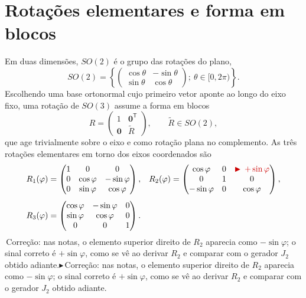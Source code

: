 \documentclass[12pt,a4paper]{article}   %
\newcommand{\nota}[1]{{\color{vermelho}%
  \ifmmode\blacktriangleright\,#1\else$\blacktriangleright$\,#1\fi}}
\begin{document}
\section{Rota\c{c}\~oes elementares e forma em blocos}

Em duas dimens\~oes, $SO(2)$ \'e o grupo das rota\c{c}\~oes do plano,
\begin{equation}
SO(2)=\left\{
\begin{pmatrix} \cos\theta & -\sin\theta \\ \sin\theta & \cos\theta
\end{pmatrix};\ \theta\in[0,2\pi)\right\}.
\end{equation}
Escolhendo uma base ortonormal cujo primeiro vetor aponte ao longo do
eixo fixo, uma rota\c{c}\~ao de $SO(3)$ assume a forma em blocos
\begin{equation}
R=\begin{pmatrix} 1 & \bm{0}^{\mathsf T}\\[2pt] \bm{0} & \tilde R
\end{pmatrix},\qquad \tilde R\in SO(2),
\end{equation}
que age trivialmente sobre o eixo e como rota\c{c}\~ao plana no
complemento. As tr\^es rota\c{c}\~oes elementares em torno dos eixos
coordenados s\~ao
\begin{align}
R_1(\varphi)&=\begin{pmatrix}
1 & 0 & 0\\ 0 & \cos\varphi & -\sin\varphi\\ 0 & \sin\varphi & \cos\varphi
\end{pmatrix},
&
R_2(\varphi)&=\begin{pmatrix}
\cos\varphi & 0 & \nota{+\sin\varphi}\\ 0 & 1 & 0\\ -\sin\varphi & 0 & \cos\varphi
\end{pmatrix},
\\[4pt]
R_3(\varphi)&=\begin{pmatrix}
\cos\varphi & -\sin\varphi & 0\\ \sin\varphi & \cos\varphi & 0\\ 0 & 0 & 1
\end{pmatrix}.
\end{align}
\nota{Corre\c{c}\~ao: nas notas, o elemento superior direito de
$R_2$ aparecia como $-\sin\varphi$; o sinal correto \'e $+\sin\varphi$,
como se v\^e ao derivar $R_2$ e comparar com o gerador $J_2$ obtido
adiante.}
\end{document}
